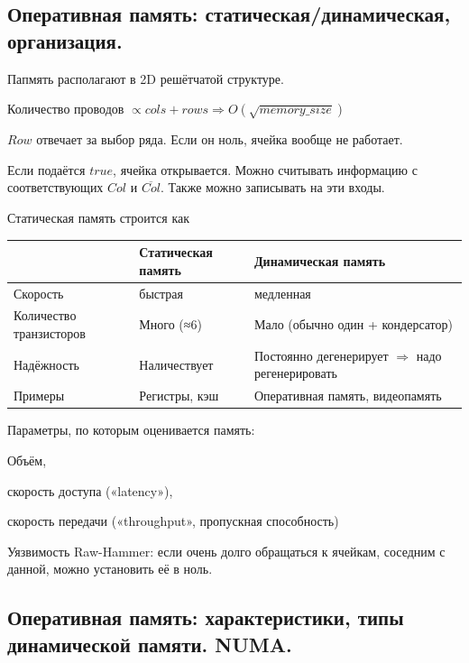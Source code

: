\documentclass[12pt, a4paper]{article}
\begin{document}
\subsection{Оперативная память: статическая/динамическая, организация.}

Папмять располагают в 2D решётчатой структуре.

Количество проводов $\propto cols + rows  \Rightarrow O(\sqrt{memory\_size})$

$Row$ отвечает за выбор ряда. Если он ноль, ячейка вообще не работает.

Если подаётся $true$, ячейка открывается. Можно считывать информацию с соответствующих $Col$ и $\overline{Col}$.
Также можно записывать на эти входы.


Статическая память строится как 

\begin{center}
    \begin{tabular}{|| m{10em} | m{10em} | m{12em} ||} 
     \hline
     &                          \textbf{Статическая память}  & \textbf{Динамическая память} \\ [0.5ex] 
     \hline\hline
     Скорость &                 быстрая             & медленная \\ 
     \hline 
     Количество транзисторов &  Много (≈6)          & Мало (обычно один + кондерсатор) \\ 
     \hline
     Надёжность &  Наличествует          & Постоянно дегенерирует $\Rightarrow$ надо регенерировать  \\
     \hline
     Примеры &  Регистры, кэш          & Оперативная память, видеопамять  \\
     \hline
    \end{tabular}
\end{center}

Параметры, по которым оценивается память:
\begin{center}
    Объём, 
    
    скорость доступа («latency»), 
    
    скорость передачи («throughput», пропускная способность)
\end{center}

Уязвимость Raw-Hammer: если очень долго обращаться к ячейкам, соседним с данной, можно установить её в ноль.




\subsection{Оперативная память: характеристики, типы динамической памяти. NUMA.}
\end{document}
